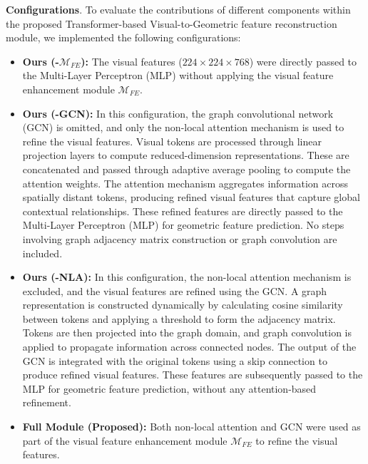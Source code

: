 \textbf{Configurations}. To evaluate the contributions of different components within the proposed Transformer-based Visual-to-Geometric feature reconstruction module, we implemented the following configurations:
\begin{itemize}
    \item \textbf{Ours (-$\mathcal{M}_{FE}$):} The visual features ($224 \times 224 \times 768$) were directly passed to the Multi-Layer Perceptron (MLP) without applying the visual feature enhancement module $\mathcal{M}_{FE}$.
    \item \textbf{Ours (-GCN):} In this configuration, the graph convolutional network (GCN) is omitted, and only the non-local attention mechanism is used to refine the visual features. Visual tokens are processed through linear projection layers to compute reduced-dimension representations. These are concatenated and passed through adaptive average pooling to compute the attention weights. The attention mechanism aggregates information across spatially distant tokens, producing refined visual features that capture global contextual relationships. These refined features are directly passed to the Multi-Layer Perceptron (MLP) for geometric feature prediction. No steps involving graph adjacency matrix construction or graph convolution are included.
    \item \textbf{Ours (-NLA):} In this configuration, the non-local attention mechanism is excluded, and the visual features are refined using the GCN. A graph representation is constructed dynamically by calculating cosine similarity between tokens and applying a threshold to form the adjacency matrix. Tokens are then projected into the graph domain, and graph convolution is applied to propagate information across connected nodes. The output of the GCN is integrated with the original tokens using a skip connection to produce refined visual features. These features are subsequently passed to the MLP for geometric feature prediction, without any attention-based refinement.
    \item \textbf{Full Module (Proposed):} Both non-local attention and GCN were used as part of the visual feature enhancement module $\mathcal{M}_{FE}$ to refine the visual features.
\end{itemize}



